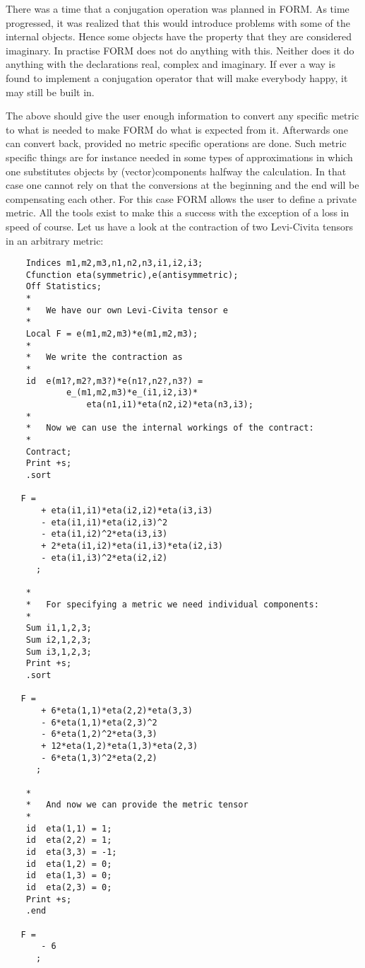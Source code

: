 \noindent There was a time that a conjugation operation 
was planned in FORM. As time progressed, it was realized that this would 
introduce problems with some of the internal objects. Hence some objects 
have the property that they are considered imaginary. In 
practise FORM does not do anything with this. Neither does it do anything 
with the declarations real, complex and 
imaginary. If ever a way is found to implement a conjugation 
operator that will make everybody happy, it may still be built in. \hfill 
\vspace{2mm}

\noindent The above should give the user enough information to convert any 
specific metric to what is needed to make FORM do what is expected from it. 
Afterwards one can convert back, provided no metric specific 
operations are done. Such metric specific things are for instance needed in 
some types of approximations in which one substitutes objects by 
(vector)components halfway the calculation. In that case one cannot rely on 
that the conversions at the beginning and the end will be compensating each 
other. For this case FORM allows the user to define a private metric. All 
the tools exist to make this a success with the exception of a loss in 
speed of course. Let us have a look at the contraction of two Levi-Civita 
tensors in an arbitrary metric:
\begin{verbatim}
    Indices m1,m2,m3,n1,n2,n3,i1,i2,i3;
    Cfunction eta(symmetric),e(antisymmetric);
    Off Statistics;
    *
    *   We have our own Levi-Civita tensor e
    *
    Local F = e(m1,m2,m3)*e(m1,m2,m3);
    *
    *   We write the contraction as
    *
    id  e(m1?,m2?,m3?)*e(n1?,n2?,n3?) =
            e_(m1,m2,m3)*e_(i1,i2,i3)*
                eta(n1,i1)*eta(n2,i2)*eta(n3,i3);
    *
    *   Now we can use the internal workings of the contract:
    *
    Contract;
    Print +s;
    .sort

   F =
       + eta(i1,i1)*eta(i2,i2)*eta(i3,i3)
       - eta(i1,i1)*eta(i2,i3)^2
       - eta(i1,i2)^2*eta(i3,i3)
       + 2*eta(i1,i2)*eta(i1,i3)*eta(i2,i3)
       - eta(i1,i3)^2*eta(i2,i2)
      ;

    *
    *   For specifying a metric we need individual components:
    *
    Sum i1,1,2,3;
    Sum i2,1,2,3;
    Sum i3,1,2,3;
    Print +s;
    .sort

   F =
       + 6*eta(1,1)*eta(2,2)*eta(3,3)
       - 6*eta(1,1)*eta(2,3)^2
       - 6*eta(1,2)^2*eta(3,3)
       + 12*eta(1,2)*eta(1,3)*eta(2,3)
       - 6*eta(1,3)^2*eta(2,2)
      ;

    *
    *   And now we can provide the metric tensor
    *
    id  eta(1,1) = 1;
    id  eta(2,2) = 1;
    id  eta(3,3) = -1;
    id  eta(1,2) = 0;
    id  eta(1,3) = 0;
    id  eta(2,3) = 0;
    Print +s;
    .end

   F =
       - 6
      ;
\end{verbatim}
